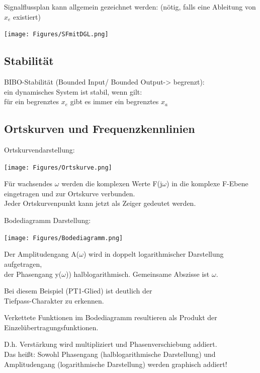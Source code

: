 \documentclass[10pt,a4paper]{article}
\begin{document}
Signalflussplan kann allgemein gezeichnet werden: (nötig, falls eine Ableitung von $x_e$ existiert)

\texttt{[image: Figures/SFmitDGL.png]}

\subsection{Stabilität}
\begin{mdframed}[style=exercise]
	BIBO-Stabilität (Bounded Input/ Bounded Output-> begrenzt):\\
	ein dynamisches System ist stabil, wenn gilt:\\
	für ein begrenztes $x_e$ gibt es immer ein begrenztes $x_a$
\end{mdframed}

\subsection{Ortskurven und Frequenzkennlinien}

Ortskurvendarstellung:
\begin{center}
	\texttt{[image: Figures/Ortskurve.png]}
\end{center}
\begin{mdframed}[style=exercise]
	Für wachsendes $\omega$ werden die komplexen Werte F(j$\omega$) in die
	komplexe F-Ebene eingetragen und zur Ortskurve verbunden.\\ Jeder
	Ortskurvenpunkt kann jetzt als Zeiger gedeutet werden.
\end{mdframed}

\newpage
Bodediagramm Darstellung:
\begin{center}
	\texttt{[image: Figures/Bodediagramm.png]}
\end{center}
\begin{mdframed}[style=exercise]
	Der Amplitudengang A($\omega$) wird in doppelt logarithmischer Darstellung
	aufgetragen,\\ der Phasengang y($\omega$)) halblogarithmisch. Gemeinsame
	Abszisse ist $\omega$.

	Bei diesem Beispiel (PT1-Glied) ist deutlich der\\ Tiefpass-Charakter zu
	erkennen.

	Verkettete Funktionen im Bodediagramm resultieren als Produkt der
	Einzelübertragungsfunktionen.

	D.h. Verstärkung wird multipliziert und Phasenverschiebung addiert.\\ Das
	heißt: Sowohl Phasengang (halblogarithmische Darstellung) und Amplitudengang
	(logarithmische Darstellung) werden graphisch addiert!
\end{mdframed}
\end{document}
